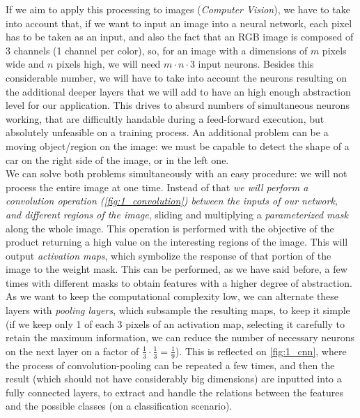 If we aim to apply this processing to images (\textit{Computer Vision}), we have to take into account that, if we want to input an image into a neural network, each pixel has to be taken as an input, and also the fact that an RGB image is composed of 3 channels (1 channel per color), so, for an image with a dimensions of $m$ pixels wide and $n$ pixels high, we will need $m\cdot n \cdot 3$ input neurons. Besides this considerable number, we will have to take into account the neurons resulting on the additional deeper layers that we will add to have an high enough abstraction level for our application. This drives to absurd numbers of simultaneous neurons working, that are difficultly handable during a feed-forward execution, but absolutely unfeasible on a training process. An additional problem can be a moving object/region on the image: we must be capable to detect the shape of a car on the right side of the image, or in the left one.\\

We can solve both problems simultaneously with an easy procedure: we will not process the entire image at one time. Instead of that \textit{we will perform a convolution operation (\autoref{fig:1_convolution}) between the inputs of our network, and different regions of the image}, sliding and multiplying a \emph{parameterized mask} along the whole image. This operation is performed with the objective of the product returning a high value on the interesting regions of the image. This will output \emph{activation maps}, which symbolize the response of that portion of the image to the weight mask. This can be performed, as we have said before, a few times with different masks to obtain features with a higher degree of abstraction. As we want to keep the computational complexity low, we can alternate these layers with \textit{pooling layers}, which subsample the resulting maps, to keep it simple (if we keep only 1 of each 3 pixels of an activation map, selecting it carefully to retain the maximum information, we can reduce the number of necessary neurons on the next layer on a factor of $\frac{1}{3} \cdot \frac{1}{3} = \frac{1}{9}$). This is reflected on \autoref{fig:1_cnn}, where the process of convolution-pooling can be repeated a few times, and then the result (which should not have considerably big dimensions) are inputted into a fully connected layers, to extract and handle the relations between the features and the possible classes (on a classification scenario).\\


